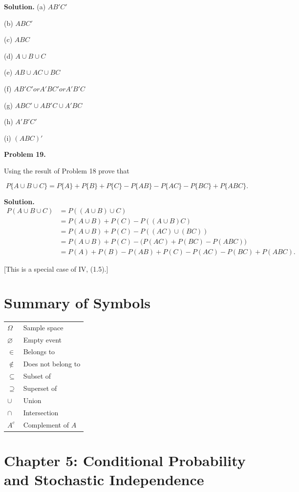 \documentclass[12pt]{article}
\begin{document}
\textbf{Solution.}
(a) $AB'C'$

(b) $ABC'$

(c) $ABC$

(d) $A \cup B \cup C$

(e) $AB \cup AC \cup BC$

(f) $AB'C' or A'BC' or A'B'C$

(g) $ABC' \cup AB'C \cup A'BC$

(h) $A'B'C'$

(i) $(ABC)'$


\textbf{Problem 19.}

Using the result of Problem 18 prove that

\[
P\{A \cup B \cup C\}
=
P\{A\}
+
P\{B\}
+
P\{C\}
-
P\{AB\}
-
P\{AC\}
-
P\{BC\}
+
P\{ABC\}.
\]

\textbf{Solution.}
\[
\begin{aligned}
P(A \cup B \cup C)
&= P((A \cup B) \cup C) \\
&= P(A \cup B)+P(C)-P((A \cup B)C) \\
&= P(A \cup B)+P(C)-P((AC)\cup(BC)) \\
&= P(A \cup B)+P(C)-\bigl(P(AC)+P(BC)-P(ABC)\bigr) \\
&= P(A)+P(B)-P(AB)+P(C)-P(AC)-P(BC)+P(ABC).
\end{aligned}
\]

\hfill [This is a special case of IV, (1.5).]

\section*{Summary of Symbols}

\begin{center}
\begin{tabular}{ll}
\(\Omega\) & Sample space \\
\(\varnothing\) & Empty event \\
\(\in\) & Belongs to \\
\(\notin\) & Does not belong to \\
\(\subseteq\) & Subset of \\
\(\supseteq\) & Superset of \\
\(\cup\) & Union \\
\(\cap\) & Intersection \\
\(A^c\) & Complement of \(A\) \\
\end{tabular}
\end{center}

\section*{Chapter 5: Conditional Probability and Stochastic Independence}
\end{document}
